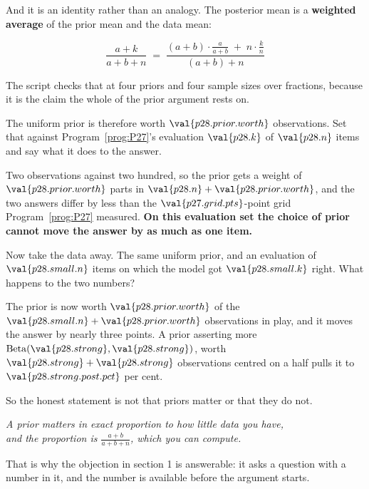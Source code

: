 \begin{fr}

And it is an identity rather than an analogy. The posterior mean is a
\textbf{weighted average} of the prior mean and the data mean:

\[ \frac{a+k}{a+b+n}
   \;=\;
   \frac{(a+b)\cdot\frac{a}{a+b} \;+\; n\cdot\frac{k}{n}}{(a+b) + n} \]

The script checks that at four priors and four sample sizes over fractions,
because it is the claim the whole of the prior argument rests on.

The uniform prior is therefore worth $\val{p28.prior.worth}$ observations.
Set that against Program~\ref{prog:P27}'s evaluation \dash{}
$\val{p28.k}$ of $\val{p28.n}$ items \dash{} and say what it does to the
answer.
\dotline
\nextframe
\end{fr}

\begin{fr}

Two observations against two hundred, so the prior gets a weight of
$\val{p28.prior.worth}$ parts in $\val{p28.n} + \val{p28.prior.worth}$, and
the two answers differ by less than the $\val{p27.grid.pts}$-point grid
Program~\ref{prog:P27} measured. \textbf{On this evaluation set the choice of
prior cannot move the answer by as much as one item.}


Now take the data away. The same uniform prior, and an evaluation of
$\val{p28.small.n}$ items on which the model got $\val{p28.small.k}$ right.
What happens to the two numbers?
\dotline
\nextframe
\end{fr}

\begin{fr}

The prior is now worth $\val{p28.prior.worth}$ of the
$\val{p28.small.n} + \val{p28.prior.worth}$ observations in play, and it moves
the answer by nearly three points. A prior asserting more \dash{}
$\mathrm{Beta}(\val{p28.strong}, \val{p28.strong})$, worth
$\val{p28.strong}+\val{p28.strong}$ observations centred on a half \dash{}
pulls it to $\val{p28.strong.post.pct}$ per cent.

So the honest statement is not that priors matter or that they do not.

\begin{center}
\emph{A prior matters in exact proportion to how little data you have,\\
and the proportion is $\frac{a+b}{a+b+n}$, which you can compute.}
\end{center}

That is why the objection in section 1 is answerable: it asks a question with
a number in it, and the number is available before the argument starts.
\end{fr}

